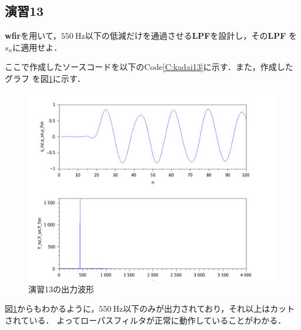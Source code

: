 \documentclass[a4paper,11pt]{jsarticle}
\begin{document}
  \subsection{演習13}
    \begin{screen}
      \textbf{wfir}を用いて，$\SI{550}{\hertz}$以下の低減だけを通過させる\textbf{LPF}を設計し，その\textbf{LPF}
      を$s_n$に適用せよ．
  \end{screen}  
  ここで作成したソースコードを以下のCode\ref{C:kadai13}に示す．また，作成したグラフ
  を図\ref{G:kadai13}に示す．
  
  \begin{figure}[H]
    \centering
    \includegraphics[width=0.8\linewidth]{picture/kadai13.png}
    \caption{演習13の出力波形}
    \label{G:kadai13}
  \end{figure}
  図\ref{G:kadai13}からもわかるように，$\SI{550}{\hertz}$以下のみが出力されており，それ以上はカットされている．
  よってローパスフィルタが正常に動作していることがわかる．
\end{document}
